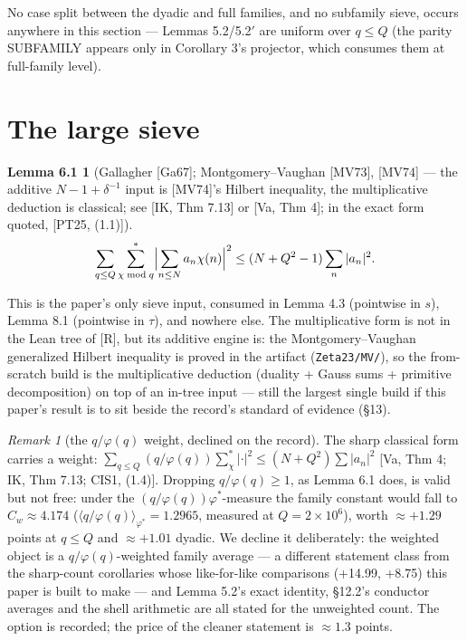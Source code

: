 \documentclass[11pt]{amsart}
\theoremstyle{plain}
\newtheorem*{lemmasixone}{Lemma 6.1}
\theoremstyle{remark}
\newtheorem*{remarkenv}{Remark}
\begin{document}
No case split between the dyadic and full families, and no subfamily sieve, occurs
anywhere in this section --- Lemmas 5.2/5.2$'$ are uniform over $q \le Q$ (the parity
SUBFAMILY appears only in Corollary 3's projector, which consumes them at full-family
level).

\section{The large sieve}

\begin{lemmasixone}[{Gallagher [Ga67]; Montgomery--Vaughan [MV73], [MV74] --- the
additive $N - 1 + \delta^{-1}$ input is [MV74]'s Hilbert inequality, the
multiplicative deduction is classical; see [IK, Thm 7.13] or [Va, Thm 4]; in the
exact form quoted, [PT25, (1.1)]}]
\[
\sum_{q\le Q}\sum^{*}_{\chi \bmod q}\Bigl|\sum_{n\le N}a_n\chi(n)\Bigr|^2
\le (N + Q^2 - 1)\sum_n|a_n|^2.
\]
\end{lemmasixone}

This is the paper's only sieve input, consumed in Lemma 4.3 (pointwise in $s$),
Lemma 8.1 (pointwise in $\tau$), and nowhere else. The multiplicative form is not in
the Lean tree of [R], but its additive engine is: the Montgomery--Vaughan generalized
Hilbert inequality is proved in the artifact (\texttt{Zeta23/MV/}), so the
from-scratch build is the multiplicative deduction (duality + Gauss sums + primitive
decomposition) on top of an in-tree input --- still the largest single build if this
paper's result is to sit beside the record's standard of evidence (\S13).

\begin{remarkenv}[the $q/\varphi(q)$ weight, declined on the record]
The sharp classical form carries a weight:
$\sum_{q\le Q}(q/\varphi(q))\sum^{*}_{\chi}|\cdot|^2 \le (N + Q^2)\sum|a_n|^2$
[Va, Thm 4; IK, Thm 7.13; CIS1, (1.4)]. Dropping $q/\varphi(q) \ge 1$, as Lemma 6.1
does, is valid but not free: under the $(q/\varphi(q))\varphi^{*}$-measure the family
constant would fall to $C_w \approx 4.174$
($\langle q/\varphi(q)\rangle_{\varphi^{*}} = 1.2965$, measured at $Q = 2\times10^6$),
worth $\approx +1.29$ points at $q \le Q$ and $\approx +1.01$ dyadic. We decline it
deliberately: the weighted object is a $q/\varphi(q)$-weighted family average --- a
different statement class from the sharp-count corollaries whose like-for-like
comparisons (+14.99, +8.75) this paper is built to make --- and Lemma 5.2's exact
identity, \S12.2's conductor averages and the shell arithmetic are all stated for the
unweighted count. The option is recorded; the price of the cleaner statement is
$\approx 1.3$ points.
\end{remarkenv}
\end{document}
